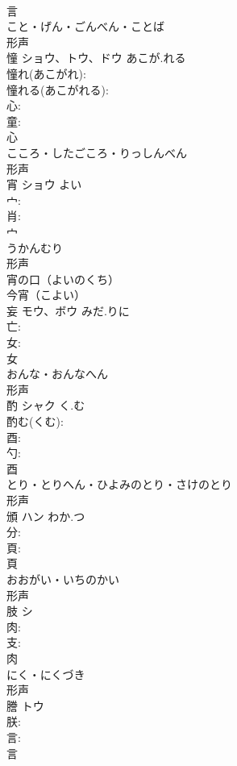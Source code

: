 \documentclass[8pt]{extreport}
\begin{document}
\begin{CJK}{UTF8}{min}
\\	言	
\\	こと・げん・ごんべん・ことば	
\\	形声 
\\	憧	ショウ、トウ、ドウ	あこが.れる		
\\	憧れ(あこがれ): 
\\	憧れる(あこがれる): 
\\	心: 
\\	童: 
\\	心	
\\	こころ・したごころ・りっしんべん	
\\	形声 
\\	宵	ショウ	よい		
\\	宀: 
\\	肖: 
\\	宀	
\\	うかんむり	
\\	形声 
\\	宵の口（よいのくち）
\\	今宵（こよい）
\\	妄	モウ、ボウ	みだ.りに		
\\	亡: 
\\	女: 
\\	女	
\\	おんな・おんなへん	
\\	形声 
\\	酌	シャク	く.む		
\\	酌む(くむ): 
\\	酉: 
\\	勺: 
\\	酉	
\\	とり・とりへん・ひよみのとり・さけのとり	
\\	形声 
\\	頒	ハン	わか.つ		
\\	分: 
\\	頁: 
\\	頁	
\\	おおがい・いちのかい	
\\	形声 
\\	肢	シ			
\\	肉: 
\\	支: 
\\	肉	
\\	にく・にくづき	
\\	形声 
\\	謄	トウ			
\\	朕: 
\\	言: 
\\	言	

\end{CJK}
\end{document}

